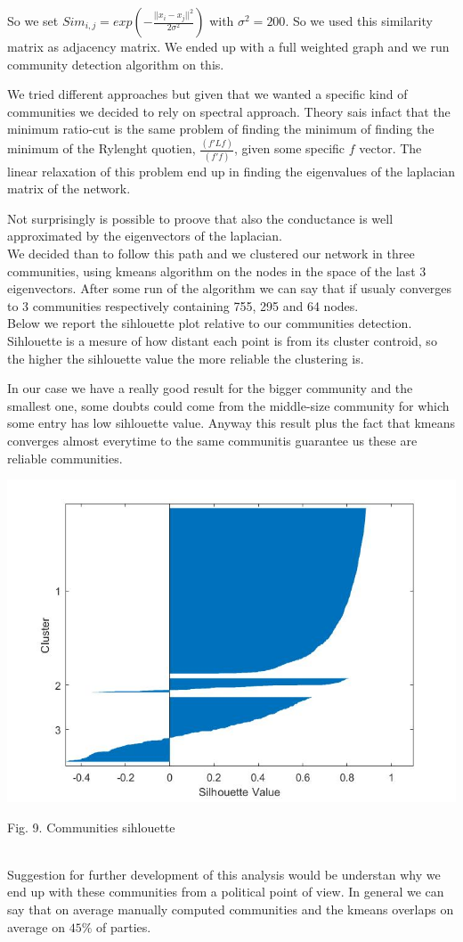 \documentclass{article}%
\begin{document}
So we set $Sim_{i,j}= exp(- \frac{||x_i-x_j||^2}{2\sigma^2})$ with $\sigma^2=200$. So we used this similarity matrix as adjacency matrix. We ended up with a full weighted graph and we run community detection algorithm on this.

We tried different approaches but given that we wanted a specific kind of communities we decided to rely on spectral approach. Theory sais infact that the minimum ratio-cut is the same problem of finding the minimum of finding the minimum of the Rylenght quotien, $\frac{(f'Lf)}{(f'f)}$, given some specific $f$ vector. The linear relaxation of this problem end up in finding the eigenvalues of the laplacian matrix of the network.

Not surprisingly is possible to proove that also the conductance is well approximated by the eigenvectors of the laplacian.
\\

We decided than to follow this path and we clustered our network in three communities, using kmeans algorithm on the nodes in the space of the last 3 eigenvectors. After some run of the algorithm we can say that if usualy converges to 3 communities respectively containing 755, 295 and 64 nodes.
\\

Below we report the sihlouette plot relative to our communities detection. Sihlouette is a mesure of how distant each point is from its cluster controid, so the higher the sihlouette value the more reliable the clustering is.

In our case we have a really good result for the bigger community and the smallest one, some doubts could come from the middle-size community for which some entry has low sihlouette value. Anyway this result plus the fact that kmeans converges almost everytime to the same communitis guarantee us these are reliable communities.

\includegraphics[scale=0.5]{sihlouette}
\begin{center}
\begin{small}
Fig. 9. Communities sihlouette
\end{small}
\end{center}
~
\\

Suggestion for further development of this analysis would be understan why we end up with these communities from a political point of view. 
In general we can say that on average manually computed communities and the kmeans overlaps on average on $45\%$ of parties.
\end{document}
